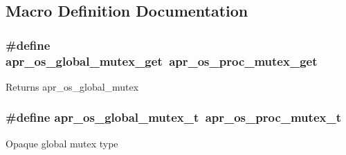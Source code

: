 \subsection{Macro Definition Documentation}
\hypertarget{group__apr__portabile_gae9be7821e8c021915c930fc83d6d4a73}{
\subsubsection[{apr\-\_\-os\-\_\-global\-\_\-mutex\-\_\-get}]{\setlength{\rightskip}{0pt plus 5cm}\#define apr\-\_\-os\-\_\-global\-\_\-mutex\-\_\-get~{\bf apr\-\_\-os\-\_\-proc\-\_\-mutex\-\_\-get}}}\label{group__apr__portabile_gae9be7821e8c021915c930fc83d6d4a73}
\begin{DoxyReturn}{Returns}
apr\-\_\-os\-\_\-global\-\_\-mutex 
\end{DoxyReturn}
\hypertarget{group__apr__portabile_gadd3a9818afc16248c3c30f22e19838dd}{
\subsubsection[{apr\-\_\-os\-\_\-global\-\_\-mutex\-\_\-t}]{\setlength{\rightskip}{0pt plus 5cm}\#define apr\-\_\-os\-\_\-global\-\_\-mutex\-\_\-t~{\bf apr\-\_\-os\-\_\-proc\-\_\-mutex\-\_\-t}}}\label{group__apr__portabile_gadd3a9818afc16248c3c30f22e19838dd}
Opaque global mutex type 

